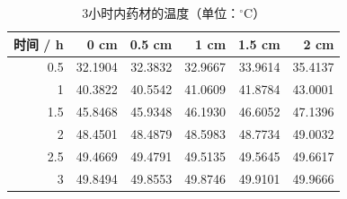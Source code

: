 \begin{table}[htbp]
\caption{3小时内药材的温度（单位：$^\circ$C）}\label{tab:required-3}
\centering
\small
\begin{tabular}{rrrrrr}
\toprule
时间 / h & 0 cm & 0.5 cm & 1 cm & 1.5 cm & 2 cm \\
\midrule
0.5 & 32.1904 & 32.3832 & 32.9667 & 33.9614 & 35.4137 \\
1 & 40.3822 & 40.5542 & 41.0609 & 41.8784 & 43.0001 \\
1.5 & 45.8468 & 45.9348 & 46.1930 & 46.6052 & 47.1396 \\
2 & 48.4501 & 48.4879 & 48.5983 & 48.7734 & 49.0032 \\
2.5 & 49.4669 & 49.4791 & 49.5135 & 49.5645 & 49.6617 \\
3 & 49.8494 & 49.8553 & 49.8746 & 49.9101 & 49.9666 \\
\bottomrule
\end{tabular}
\end{table}
